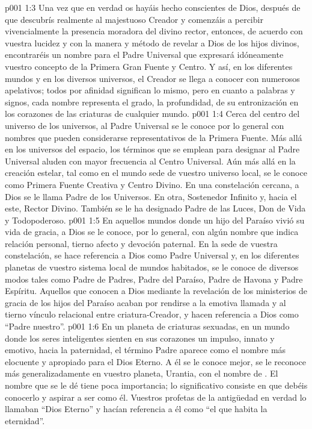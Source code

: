 \vs p001 1:3 Una vez que en verdad os hayáis hecho conscientes de Dios, después de que descubrís realmente al majestuoso Creador y comenzáis a percibir vivencialmente la presencia moradora del divino rector, entonces, de acuerdo con vuestra lucidez y con la manera y método de revelar a Dios de los hijos divinos, encontraréis un nombre para el Padre Universal que expresará idóneamente vuestro concepto de la Primera Gran Fuente y Centro. Y así, en los diferentes mundos y en los diversos universos, el Creador se llega a conocer con numerosos apelativos; todos por afinidad significan lo mismo, pero en cuanto a palabras y signos, cada nombre representa el grado, la profundidad, de su entronización en los corazones de las criaturas de cualquier mundo.
\vs p001 1:4 \pc Cerca del centro del universo de los universos, al Padre Universal se le conoce por lo general con nombres que pueden considerarse representativos de la Primera Fuente. Más allá en los universos del espacio, los términos que se emplean para designar al Padre Universal aluden con mayor frecuencia al Centro Universal. Aún más allá en la creación estelar, tal como en el mundo sede de vuestro universo local, se le conoce como Primera Fuente Creativa y Centro Divino. En una constelación cercana, a Dios se le llama Padre de los Universos. En otra, Sostenedor Infinito y, hacia el este, Rector Divino. También se le ha designado Padre de las Luces, Don de Vida y Todopoderoso.
\vs p001 1:5 En aquellos mundos donde un hijo del Paraíso vivió su vida de gracia, a Dios se le conoce, por lo general, con algún nombre que indica relación personal, tierno afecto y devoción paternal. En la sede de vuestra constelación, se hace referencia a Dios como Padre Universal y, en los diferentes planetas de vuestro sistema local de mundos habitados, se le conoce de diversos modos tales como Padre de Padres, Padre del Paraíso, Padre de Havona y Padre Espíritu. Aquellos que conocen a Dios mediante la revelación de los ministerios de gracia de los hijos del Paraíso acaban por rendirse a la emotiva llamada y al tierno vínculo relacional entre criatura\hyp{}Creador, y hacen referencia a Dios como “Padre nuestro”.
\vs p001 1:6 En un planeta de criaturas sexuadas, en un mundo donde los seres inteligentes sienten en sus corazones un impulso, innato y emotivo, hacia la paternidad, el término Padre aparece como el nombre más elocuente y apropiado para el Dios Eterno. A él se le conoce mejor, se le reconoce más generalizadamente en vuestro planeta, Urantia, con el nombre de . El nombre que se le dé tiene poca importancia; lo significativo consiste en que debéis conocerlo y aspirar a ser como él. Vuestros profetas de la antigüedad en verdad lo llamaban “Dios Eterno” y hacían referencia a él como “el que habita la eternidad”.
